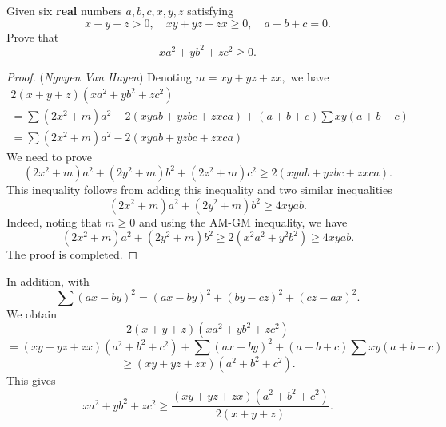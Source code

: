 \documentclass[12pt,a4paper]{book}
\begin{document}
\begin{pro}
Given six \textbf{real} numbers $a, b, c, x, y, z$ satisfying
$$x+y+z>0, \quad x y+y z+z x \geqslant 0, \quad a+b+c=0.$$
Prove that
$$x a^2+y b^2+z c^2 \geqslant 0.$$
\end{pro}

\begin{proof} (\textit{Nguyen Van Huyen}) 
Denoting $m=x y+y z+z x,$ we have
$$
\begin{gathered}
2(x+y+z)(x a^2+y b^2+z c^2) \\
=\sum (2 x^2+m) a^2-2(x y a b+y z b c+z x c a)+(a+b+c) \sum x y(a+b-c) \\
=\sum (2 x^2+m) a^2-2(x y a b+y z b c+z x c a)
\end{gathered}
$$
We need to prove
$$(2 x^2+m) a^2+(2 y^2+m) b^2+(2 z^2+m) c^2 \geqslant 2(x y a b+y z b c+z x c a).$$
This inequality follows from adding this inequality and two similar inequalities
$$(2x^2+m)a^2 + (2y^2+m)b^2 \ge 4 x y a b.$$
Indeed, noting that $m \geqslant 0$ and using the AM-GM inequality, we have
$$(2 x^2+m) a^2+(2 y^2+m) b^2 \geqslant 2(x^2 a^2+y^2 b^2) \geqslant 4xyab.$$
The proof is completed.
\end{proof}

\begin{note}
In addition, with
\[\sum (ax-by)^2 = (ax-by)^2 + (by-cz)^2 + (cz-ax)^2.\]
We obtain
\[2(x+y+z)(xa^2+yb^2+zc^2)\]
\[= (xy+yz+zx)(a^2+b^2+c^2) + \sum (ax-by)^2 + (a+b+c) \sum xy(a+b-c)\]
\[\ge (xy+yz+zx)(a^2+b^2+c^2).\]
This gives
\[xa^2+yb^2+zc^2 \ge \frac{(xy+yz+zx)(a^2+b^2+c^2)}{2(x+y+z)}.\]
\end{note}
\end{document}
